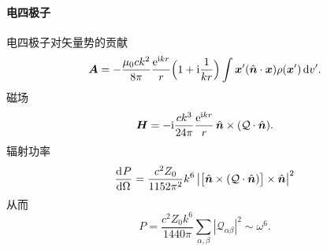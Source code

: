 \paragraph{电四极子}
电四极子对矢量势的贡献
\[
    \bm A=-\frac{\mu_0ck^2}{8\pi}\frac{\e{\i kr}}r\Bigkh{1+\i\frac1{kr}}\int\bm x'(\uvec n\cdot\bm x)\rho(\bm x')\d v'.
\]
磁场
\[
    \bm H=-\i\frac{ck^3}{24\pi}\frac{\e{\i kr}}r\uvec n\times(\mathcal Q\cdot\uvec n).
\]
辐射功率 
\[
    \dv P\Omega=\frac{c^2Z_0}{1152\pi^2}k^6\abs{\bigfkh{\uvec n\times(\mathcal Q\cdot\uvec n)}\times\uvec n}^2
\]
从而 
\[
    P=\frac{c^2Z_0k^6}{1440\pi}\sum_{\alpha,\beta}|\mathcal Q_{\alpha\beta}|^2\sim\omega^6.
\]


